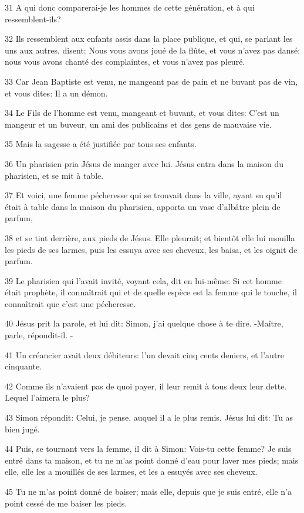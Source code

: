 \par 31 A qui donc comparerai-je les hommes de cette génération, et à qui ressemblent-ils?
\par 32 Ils ressemblent aux enfants assis dans la place publique, et qui, se parlant les uns aux autres, disent: Nous vous avons joué de la flûte, et vous n'avez pas dansé; nous vous avons chanté des complaintes, et vous n'avez pas pleuré.
\par 33 Car Jean Baptiste est venu, ne mangeant pas de pain et ne buvant pas de vin, et vous dites: Il a un démon.
\par 34 Le Fils de l'homme est venu, mangeant et buvant, et vous dites: C'est un mangeur et un buveur, un ami des publicains et des gens de mauvaise vie.
\par 35 Mais la sagesse a été justifiée par tous ses enfants.
\par 36 Un pharisien pria Jésus de manger avec lui. Jésus entra dans la maison du pharisien, et se mit à table.
\par 37 Et voici, une femme pécheresse qui se trouvait dans la ville, ayant su qu'il était à table dans la maison du pharisien, apporta un vase d'albâtre plein de parfum,
\par 38 et se tint derrière, aux pieds de Jésus. Elle pleurait; et bientôt elle lui mouilla les pieds de ses larmes, puis les essuya avec ses cheveux, les baisa, et les oignit de parfum.
\par 39 Le pharisien qui l'avait invité, voyant cela, dit en lui-même: Si cet homme était prophète, il connaîtrait qui et de quelle espèce est la femme qui le touche, il connaîtrait que c'est une pécheresse.
\par 40 Jésus prit la parole, et lui dit: Simon, j'ai quelque chose à te dire. -Maître, parle, répondit-il. -
\par 41 Un créancier avait deux débiteurs: l'un devait cinq cents deniers, et l'autre cinquante.
\par 42 Comme ils n'avaient pas de quoi payer, il leur remit à tous deux leur dette. Lequel l'aimera le plus?
\par 43 Simon répondit: Celui, je pense, auquel il a le plus remis. Jésus lui dit: Tu as bien jugé.
\par 44 Puis, se tournant vers la femme, il dit à Simon: Vois-tu cette femme? Je suis entré dans ta maison, et tu ne m'as point donné d'eau pour laver mes pieds; mais elle, elle les a mouillés de ses larmes, et les a essuyés avec ses cheveux.
\par 45 Tu ne m'as point donné de baiser; mais elle, depuis que je suis entré, elle n'a point cessé de me baiser les pieds.
